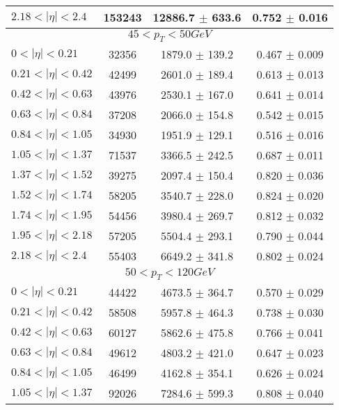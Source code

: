 \begin{tabular}{lccc}
$2.18 < |\eta| <2.4$           & 153243     & 12886.7    $\pm$ 633.6 & 0.752      $\pm$ 0.016 \\
\hline
\multicolumn{4}{c}{$45 < p_{T} < 50 GeV$} \\
\hline
$0 < |\eta| <0.21$             & 32356      & 1879.0     $\pm$ 139.2 & 0.467      $\pm$ 0.009 \\
$0.21 < |\eta| <0.42$          & 42499      & 2601.0     $\pm$ 189.4 & 0.613      $\pm$ 0.013 \\
$0.42 < |\eta| <0.63$          & 43976      & 2530.1     $\pm$ 167.0 & 0.641      $\pm$ 0.014 \\
$0.63 < |\eta| <0.84$          & 37208      & 2066.0     $\pm$ 154.8 & 0.542      $\pm$ 0.015 \\
$0.84 < |\eta| <1.05$          & 34930      & 1951.9     $\pm$ 129.1 & 0.516      $\pm$ 0.016 \\
$1.05 < |\eta| <1.37$          & 71537      & 3366.5     $\pm$ 242.5 & 0.687      $\pm$ 0.011 \\
$1.37 < |\eta| <1.52$          & 39275      & 2097.4     $\pm$ 150.4 & 0.820      $\pm$ 0.036 \\
$1.52 < |\eta| <1.74$          & 58205      & 3540.7     $\pm$ 228.0 & 0.824      $\pm$ 0.020 \\
$1.74 < |\eta| <1.95$          & 54456      & 3980.4     $\pm$ 269.7 & 0.812      $\pm$ 0.032 \\
$1.95 < |\eta| <2.18$          & 57205      & 5504.4     $\pm$ 293.1 & 0.790      $\pm$ 0.044 \\
$2.18 < |\eta| <2.4$           & 55403      & 6649.2     $\pm$ 341.8 & 0.802      $\pm$ 0.024 \\
\hline
\multicolumn{4}{c}{$50 < p_{T} < 120 GeV$} \\
\hline
$0 < |\eta| <0.21$             & 44422      & 4673.5     $\pm$ 364.7 & 0.570      $\pm$ 0.029 \\
$0.21 < |\eta| <0.42$          & 58508      & 5957.8     $\pm$ 464.3 & 0.738      $\pm$ 0.030 \\
$0.42 < |\eta| <0.63$          & 60127      & 5862.6     $\pm$ 475.8 & 0.766      $\pm$ 0.041 \\
$0.63 < |\eta| <0.84$          & 49612      & 4803.2     $\pm$ 421.0 & 0.647      $\pm$ 0.023 \\
$0.84 < |\eta| <1.05$          & 46499      & 4162.8     $\pm$ 354.1 & 0.626      $\pm$ 0.024 \\
$1.05 < |\eta| <1.37$          & 92026      & 7284.6     $\pm$ 599.3 & 0.808      $\pm$ 0.040 \\

\end{tabular}
